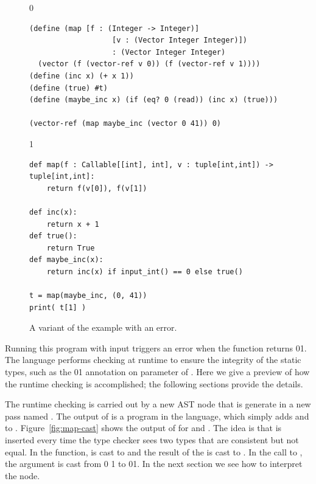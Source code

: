 \documentclass[7x10]{TimesAPriori_MIT}%
\def\racketEd{0}
\def\pythonEd{1}
\def\edition{0}
\newcommand{\racket}[1]{{\if\edition\racketEd{#1}\fi}}
\newcommand{\python}[1]{{\if\edition\pythonEd #1\fi}}
\numberwithin{theorem}{chapter}
\numberwithin{definition}{chapter}
\numberwithin{equation}{chapter}
\begin{document}
\begin{figure}[tbp]
\begin{tcolorbox}[colback=white]  
{\if\edition\racketEd    
\begin{lstlisting}
(define (map [f : (Integer -> Integer)]
                   [v : (Vector Integer Integer)])
                   : (Vector Integer Integer)
  (vector (f (vector-ref v 0)) (f (vector-ref v 1))))
(define (inc x) (+ x 1))
(define (true) #t)
(define (maybe_inc x) (if (eq? 0 (read)) (inc x) (true)))

(vector-ref (map maybe_inc (vector 0 41)) 0)
\end{lstlisting}
\fi}
{\if\edition\pythonEd    
\begin{lstlisting}
def map(f : Callable[[int], int], v : tuple[int,int]) -> tuple[int,int]:
    return f(v[0]), f(v[1])

def inc(x):
    return x + 1
def true():
    return True
def maybe_inc(x):
    return inc(x) if input_int() == 0 else true()

t = map(maybe_inc, (0, 41))
print( t[1] )
\end{lstlisting}
\fi}
\end{tcolorbox}

\caption{A variant of the  example with an error.}
\label{fig:map-maybe_inc}
\end{figure}

Running this program with input  triggers an
error when the  function returns
\racket{}\python{}.  The \LangGrad{} language
performs checking at runtime to ensure the integrity of the static
types, such as the
\racket{}\python{}
annotation on
parameter  of .
Here we give a preview of how the runtime checking is accomplished;
the following sections provide the details.

The runtime checking is carried out by a new  AST node that
is generate in a new pass named .  The output of
 is a program in the \LangCast{} language, which
simply adds  and \CANYTY{} to \LangLam{}.
%
Figure~\ref{fig:map-cast} shows the output of  for
 and .  The idea is that  is
inserted every time the type checker sees two types that are
consistent but not equal. In the  function,  is
cast to \INTTY{} and the result of the \code{+} is cast to
\CANYTY{}.  In the call to , the  argument
is cast from
\racket{}
\python{}
to 
\racket{}\python{}.
%
In the next section we see how to interpret the  node.
\end{document}
